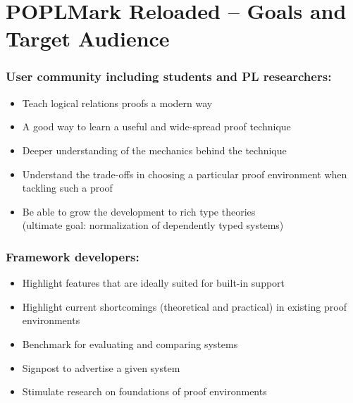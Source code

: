 \documentclass{beamer}
\begin{document}

\section{POPLMark Reloaded -- \newline Goals and Target Audience}
\begin{frame}\frametitle{User community including students and PL researchers:}%
\vspace{-3cm}


  \begin{itemize}
  \item Teach logical relations proofs a modern way 
  \item A good way to learn a useful and wide-spread proof technique
  \item Deeper understanding of the mechanics behind the technique
  \item Understand the trade-offs in choosing a particular proof
    environment when tackling such a proof
  \item Be able to grow the development to rich type theories \\
(ultimate goal: normalization of dependently typed systems)
  \end{itemize}





\end{frame}


\begin{frame}\frametitle{Framework developers:}%
\vspace{-3cm}
\begin{itemize}
\item Highlight features that are ideally suited for built-in support
\item Highlight current shortcomings (theoretical and practical) in existing proof environments
\item Benchmark for evaluating and comparing systems
\item Signpost to advertise a given system
\item Stimulate research on foundations of proof environments
\end{itemize}




\end{frame}
\end{document}
